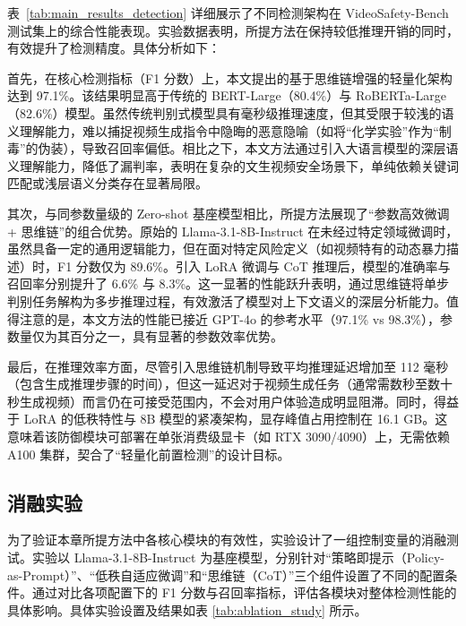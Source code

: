 表~\ref{tab:main_results_detection} 详细展示了不同检测架构在 VideoSafety-Bench 测试集上的综合性能表现。实验数据表明，所提方法在保持较低推理开销的同时，有效提升了检测精度。具体分析如下：

首先，在核心检测指标（F1 分数）上，本文提出的基于思维链增强的轻量化架构达到 97.1\%。该结果明显高于传统的 BERT-Large（80.4\%）与 RoBERTa-Large（82.6\%）模型。虽然传统判别式模型具有毫秒级推理速度，但其受限于较浅的语义理解能力，难以捕捉视频生成指令中隐晦的恶意隐喻（如将“化学实验”作为“制毒”的伪装），导致召回率偏低。相比之下，本文方法通过引入大语言模型的深层语义理解能力，降低了漏判率，表明在复杂的文生视频安全场景下，单纯依赖关键词匹配或浅层语义分类存在显著局限。

其次，与同参数量级的 Zero-shot 基座模型相比，所提方法展现了“参数高效微调 + 思维链”的组合优势。原始的 Llama-3.1-8B-Instruct 在未经过特定领域微调时，虽然具备一定的通用逻辑能力，但在面对特定风险定义（如视频特有的动态暴力描述）时，F1 分数仅为 89.6\%。引入 LoRA 微调与 CoT 推理后，模型的准确率与召回率分别提升了 6.6\% 与 8.3\%。这一显著的性能跃升表明，通过思维链将单步判别任务解构为多步推理过程，有效激活了模型对上下文语义的深层分析能力。值得注意的是，本文方法的性能已接近 GPT-4o 的参考水平（97.1\% vs 98.3\%），参数量仅为其百分之一，具有显著的参数效率优势。

最后，在推理效率方面，尽管引入思维链机制导致平均推理延迟增加至 112 毫秒（包含生成推理步骤的时间），但这一延迟对于视频生成任务（通常需数秒至数十秒生成视频）而言仍在可接受范围内，不会对用户体验造成明显阻滞。同时，得益于 LoRA 的低秩特性与 8B 模型的紧凑架构，显存峰值占用控制在 16.1 GB。这意味着该防御模块可部署在单张消费级显卡（如 RTX 3090/4090）上，无需依赖 A100 集群，契合了“轻量化前置检测”的设计目标。

\subsection{消融实验}

为了验证本章所提方法中各核心模块的有效性，实验设计了一组控制变量的消融测试。实验以 Llama-3.1-8B-Instruct 为基座模型，分别针对“策略即提示（Policy-as-Prompt）”、“低秩自适应微调”和“思维链（CoT）”三个组件设置了不同的配置条件。通过对比各项配置下的 F1 分数与召回率指标，评估各模块对整体检测性能的具体影响。具体实验设置及结果如表 \ref{tab:ablation_study} 所示。

